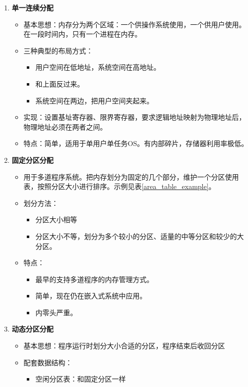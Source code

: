 \documentclass[12pt, a4paper, oneside]{ctexart}
\begin{document}
\begin{enumerate}
  \item {\bf 单一连续分配}
  \begin{itemize}
    \item 基本思想：内存分为两个区域：一个供操作系统使用，一个供用户使用。在一段时间内，只有一个进程在内存。
    \item 三种典型的布局方式：
    \begin{itemize}
      \item 用户空间在低地址，系统空间在高地址。
      \item 和上面反过来。
      \item 系统空间在两边，把用户空间夹起来。
    \end{itemize}
    \item 实现：设置基址寄存器、限界寄存器，要求逻辑地址映射为物理地址后，物理地址必须在两者之间。
    \item 特点：简单，适用于单用户单任务OS。有内部碎片，存储器利用率极低。
  \end{itemize}
  \item {\bf 固定分区分配}
  \begin{itemize}
    \item 用于多道程序系统。把内存划分为固定的几个部分，维护一个分区使用表，按照分区大小进行排序。示例见表\ref{area_table_example}。
    \item 划分方法：
    \begin{itemize}
      \item 分区大小相等
      \item 分区大小不等，划分为多个较小的分区、适量的中等分区和较少的大分区。
    \end{itemize}
    \item 特点：
    \begin{itemize}
      \item 最早的支持多道程序的内存管理方式。
      \item 简单，现在仍在嵌入式系统中应用。
      \item 内零头严重。
    \end{itemize}
  \end{itemize}
  \item {\bf 动态分区分配}
  \begin{itemize}
    \item 基本思想：程序运行时划分大小合适的分区，程序结束后收回分区
    \item 配套数据结构：
    \begin{itemize}
      \item 空闲分区表：和固定分区一样

\end{itemize}
\end{itemize}
\end{enumerate}
\end{document}
